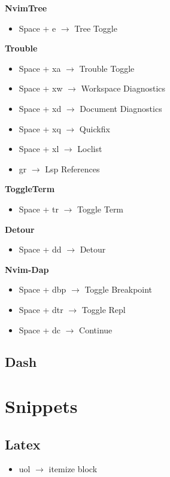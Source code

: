 \documentclass[12pt, a4paper]{article}
\begin{document}
\textbf{NvimTree}
\begin{itemize}
    \item Space + e  $\rightarrow$ Tree Toggle
\end{itemize}

\textbf{Trouble}
\begin{itemize}
    \item Space + xa $\rightarrow$ Trouble Toggle
    \item Space + xw $\rightarrow$ Workspace Diagnostics 
    \item Space + xd $\rightarrow$ Document Diagnostics 
    \item Space + xq $\rightarrow$ Quickfix 
    \item Space + xl $\rightarrow$ Loclist 
    \item gr $\rightarrow$ Lsp References 
\end{itemize}

\textbf{ToggleTerm}
\begin{itemize}
    \item Space + tr  $\rightarrow$ Toggle Term
\end{itemize}

\textbf{Detour}
\begin{itemize}
    \item Space + dd  $\rightarrow$ Detour 
\end{itemize}

\textbf{Nvim-Dap}
\begin{itemize}
    \item Space + dbp  $\rightarrow$ Toggle Breakpoint 
    \item Space + dtr  $\rightarrow$ Toggle Repl 
    \item Space + dc  $\rightarrow$ Continue 
\end{itemize}

\subsection{Dash}

\section{Snippets}

\subsection{Latex}

\begin{itemize}
    \item uol $\rightarrow$ itemize block
\end{itemize}
\end{document}
